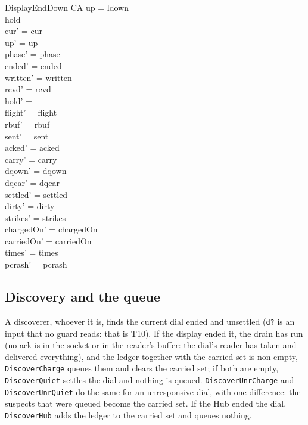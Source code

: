\documentclass[a4paper,10pt,fleqn]{article}
\begin{document}
\begin{schema}{DisplayEndDown}
  \Delta CA
\where
  up = ldown \\
  hold \neq \emptyset \\
  cur' = cur \\
  up' = up \\
  phase' = phase \\
  ended' = ended \\
  written' = written \\
  rcvd' = rcvd \\
  hold' = \emptyset \\
  flight' = flight \\
  rbuf' = rbuf \\
  sent' = sent \\
  acked' = acked \\
  carry' = carry \\
  dqown' = dqown \\
  dqcar' = dqcar \\
  settled' = settled \\
  dirty' = dirty \\
  strikes' = strikes \\
  chargedOn' = chargedOn \\
  carriedOn' = carriedOn \\
  times' = times \\
  pcrash' = pcrash
\end{schema}

\subsection{Discovery and the queue}

A discoverer, whoever it is, finds the current dial ended and unsettled
(\texttt{d?} is an input that no guard reads: that is T10).  If the display ended
it, the drain has run (no ack is in the socket or in the reader's buffer: the
dial's reader has taken and delivered everything), and the ledger together with
the carried set is non-empty, \texttt{DiscoverCharge} queues them and clears the
carried set; if both are empty, \texttt{DiscoverQuiet} settles the dial and
nothing is queued.  \texttt{DiscoverUnrCharge} and \texttt{DiscoverUnrQuiet} do the
same for an unresponsive dial, with one difference: the suspects that were queued
become the carried set.  If the Hub ended the dial, \texttt{DiscoverHub} adds the
ledger to the carried set and queues nothing.
\end{document}

